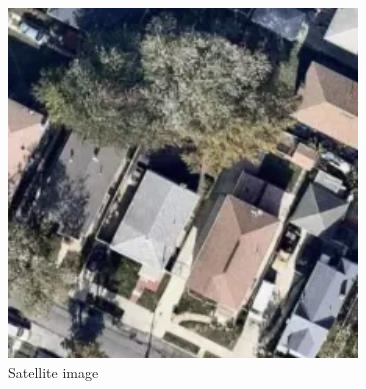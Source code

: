 \documentclass[journal，a4paper]{IEEEtran}
\begin{document}
	\begin{figure}[!hbt]
		\begin{center}
		\includegraphics[width=\columnwidth]{SAT01-00000}
		\caption{Satellite image}
		\label{fig:sat}
		\end{center}
	\end{figure}
\end{document}
